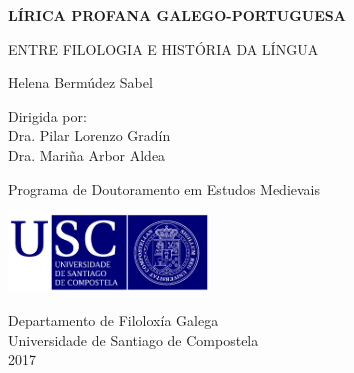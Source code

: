 \documentclass[a4paper,12pt,twoside]{book}
\begin{document}
\begin{titlepage}

    \begin{center}
    
        \vspace*{1cm}
        
        {\rmfamily \Huge{\textbf{LÍRICA PROFANA GALEGO-PORTUGUESA}}
        
        \LARGE{ENTRE FILOLOGIA E HISTÓRIA DA LÍNGUA}
       
        
        \vspace{1.5cm}
        
        
        \LARGE{Helena Bermúdez Sabel}
        
        \vspace{1cm}
        \large{Dirigida por:}\\
        \Large{Dra. Pilar Lorenzo Gradín}\\
        \Large{Dra. Mariña Arbor Aldea}
        
        \vfill
        
        \Large{Programa de Doutoramento em Estudos Medievais}
        
        \vspace{0.8cm}
        
        \includegraphics[width=0.4\textwidth]{university.png}
        
        Departamento de Filoloxía Galega\\ 
        Universidade de Santiago de Compostela\\
        2017 }
        
    \end{center}
    
\end{titlepage}
\end{document}

